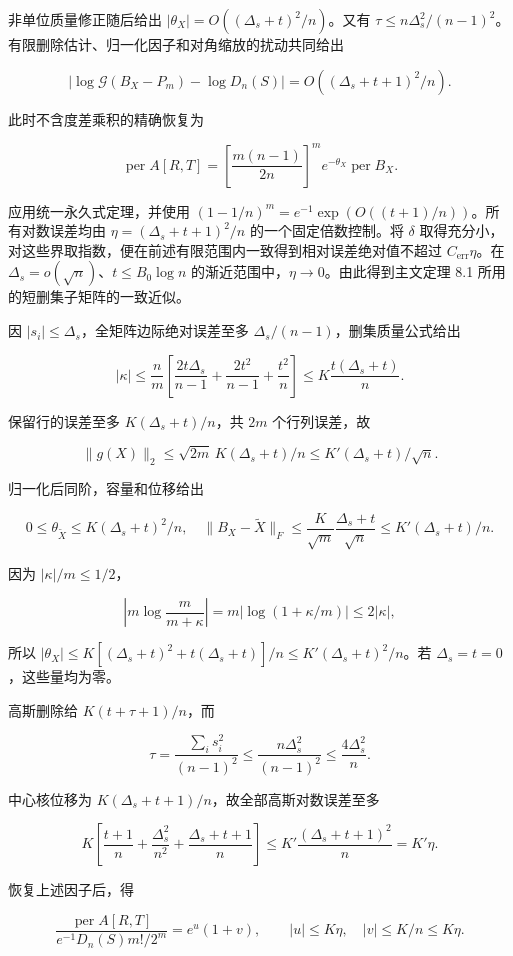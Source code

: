 \documentclass[11pt,a4paper]{article}
\begin{document}
非单位质量修正随后给出 \(|\theta_X|=O((\Delta_s+t)^2/n)\)。又有 \(\tau\le n\Delta_s^2/(n-1)^2\)。有限删除估计、归一化因子和对角缩放的扰动共同给出

\[
|\log\mathcal G(B_X-P_m)-\log D_n(S)|=O((\Delta_s+t+1)^2/n).
\]

此时不含度差乘积的精确恢复为

\[
\operatorname{per}A[R,T]=\left[\frac{m(n-1)}{2n}\right]^m e^{-\theta_X}\operatorname{per}B_X.
\]

应用统一永久式定理，并使用 \((1-1/n)^m=e^{-1}\exp(O((t+1)/n))\)。所有对数误差均由 \(\eta=(\Delta_s+t+1)^2/n\) 的一个固定倍数控制。将 \(\delta\) 取得充分小，对这些界取指数，便在前述有限范围内一致得到相对误差绝对值不超过 \(C_{\mathrm{err}}\eta\)。在 \(\Delta_s=o(\sqrt n)\)、\(t\le B_0\log n\) 的渐近范围中，\(\eta\to0\)。由此得到主文定理 8.1 所用的短删集子矩阵的一致近似。

因 \(|s_i|\le \Delta_s\)，全矩阵边际绝对误差至多 \(\Delta_s/(n-1)\)，删集质量公式给出

\[
|\kappa|\le\frac nm\left[\frac{2t\Delta_s}{n-1}+\frac{2t^2}{n-1}+\frac{t^2}n\right]
\le K\frac{t(\Delta_s+t)}n.
\]

保留行的误差至多 \(K(\Delta_s+t)/n\)，共 \(2m\) 个行列误差，故

\[
\|g(X)\|_2\le\sqrt{2m}\,K(\Delta_s+t)/n
\le K'(\Delta_s+t)/\sqrt n.
\]

归一化后同阶，容量和位移给出

\[
0\le\theta_{\widetilde X}\le K(\Delta_s+t)^2/n,
\quad
\|B_X-\widetilde X\|_F\le\frac K{\sqrt m}\frac{\Delta_s+t}{\sqrt n}
\le K'(\Delta_s+t)/n.
\]

因为 \(|\kappa|/m\le1/2\)，

\[
\left|m\log\frac m{m+\kappa}\right|
=m|\log(1+\kappa/m)|\le2|\kappa|,
\]

所以 \(|\theta_X|\le K[(\Delta_s+t)^2+t(\Delta_s+t)]/n\le K'(\Delta_s+t)^2/n\)。若 \(\Delta_s=t=0\)，这些量均为零。

高斯删除给 \(K(t+\tau+1)/n\)，而

\[
\tau=\frac{\sum_i s_i^2}{(n-1)^2}\le\frac{n\Delta_s^2}{(n-1)^2}\le\frac{4\Delta_s^2}n.
\]

中心核位移为 \(K(\Delta_s+t+1)/n\)，故全部高斯对数误差至多

\[
K\left[\frac{t+1}n+\frac{\Delta_s^2}{n^2}+\frac{\Delta_s+t+1}n\right]
\le K'\frac{(\Delta_s+t+1)^2}n=K'\eta.
\]

恢复上述因子后，得

\[
\frac{\operatorname{per}A[R,T]}{e^{-1}D_n(S)m!/2^m}
=e^u(1+v),\qquad |u|\le K\eta,\quad |v|\le K/n\le K\eta.
\]
\end{document}
